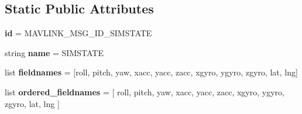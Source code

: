 \subsection*{Static Public Attributes}
\begin{DoxyCompactItemize}
\item 
\mbox{\label{classpymavlink_1_1dialects_1_1v10_1_1MAVLink__simstate__message_a36cc996b1e7330fdfb536e8171d0f5ec}} 
{\bfseries id} = M\+A\+V\+L\+I\+N\+K\+\_\+\+M\+S\+G\+\_\+\+I\+D\+\_\+\+S\+I\+M\+S\+T\+A\+TE
\item 
\mbox{\label{classpymavlink_1_1dialects_1_1v10_1_1MAVLink__simstate__message_a643b0da66aaf8dadb0e215390bd0a594}} 
string {\bfseries name} = \textquotesingle{}S\+I\+M\+S\+T\+A\+TE\textquotesingle{}
\item 
\mbox{\label{classpymavlink_1_1dialects_1_1v10_1_1MAVLink__simstate__message_a943794058e9b31ad3eff00b0c0b5196c}} 
list {\bfseries fieldnames} = \mbox{[}\textquotesingle{}roll\textquotesingle{}, \textquotesingle{}pitch\textquotesingle{}, \textquotesingle{}yaw\textquotesingle{}, \textquotesingle{}xacc\textquotesingle{}, \textquotesingle{}yacc\textquotesingle{}, \textquotesingle{}zacc\textquotesingle{}, \textquotesingle{}xgyro\textquotesingle{}, \textquotesingle{}ygyro\textquotesingle{}, \textquotesingle{}zgyro\textquotesingle{}, \textquotesingle{}lat\textquotesingle{}, \textquotesingle{}lng\textquotesingle{}\mbox{]}
\item 
\mbox{\label{classpymavlink_1_1dialects_1_1v10_1_1MAVLink__simstate__message_aac48d4e710cd307ef4ab67b7cb3e90fb}} 
list {\bfseries ordered\+\_\+fieldnames} = \mbox{[} \textquotesingle{}roll\textquotesingle{}, \textquotesingle{}pitch\textquotesingle{}, \textquotesingle{}yaw\textquotesingle{}, \textquotesingle{}xacc\textquotesingle{}, \textquotesingle{}yacc\textquotesingle{}, \textquotesingle{}zacc\textquotesingle{}, \textquotesingle{}xgyro\textquotesingle{}, \textquotesingle{}ygyro\textquotesingle{}, \textquotesingle{}zgyro\textquotesingle{}, \textquotesingle{}lat\textquotesingle{}, \textquotesingle{}lng\textquotesingle{} \mbox{]}
\item 

\end{DoxyCompactItemize}
